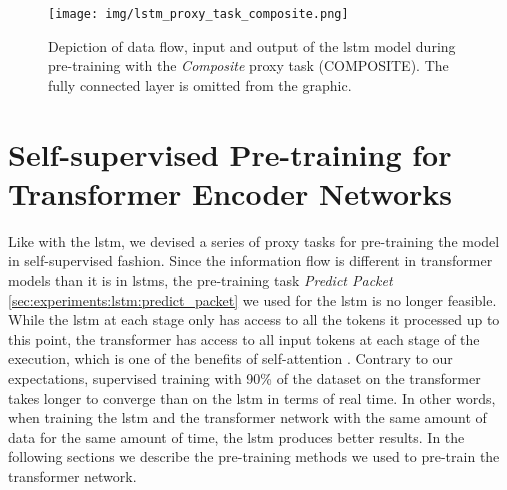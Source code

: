 \begin{figure}[]
	\centering
	\texttt{[image: img/lstm\_proxy\_task\_composite.png]}
	\caption{Depiction of data flow, input and output of the \gls{lstm} model during pre-training with the \textit{Composite} proxy task (COMPOSITE). The fully connected layer is omitted from the graphic. }
	\label{fig:experiments:unsupervised_lstm_composite}
\end{figure}	

\FloatBarrier

\section{Self-supervised Pre-training for Transformer Encoder Networks} \label{sec:experiments:transformer}

Like with the \gls{lstm}, we devised a series of proxy tasks for pre-training the model in self-supervised fashion. Since the information flow is different in transformer models than it is in \glspl{lstm}, the pre-training task \textit{Predict Packet} \ref{sec:experiments:lstm:predict_packet} we used for the \gls{lstm} is no longer feasible. While the \gls{lstm} at each stage only has access to all the tokens it processed up to this point, the transformer has access to all input tokens at each stage of the execution, which is one of the benefits of self-attention \cite{attention}. Contrary to our expectations, supervised training with 90\% of the dataset on the transformer takes longer to converge than on the \gls{lstm} in terms of real time. In other words, when training the \gls{lstm} and the transformer network with the same amount of data for the same amount of time, the \gls{lstm} produces better results. In the following sections we describe the pre-training methods we used to pre-train the transformer network.

